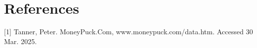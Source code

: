 \section*{References}

{
\small

[1] Tanner, Peter. MoneyPuck.Com, www.moneypuck.com/data.htm. Accessed 30 Mar. 2025. 


}